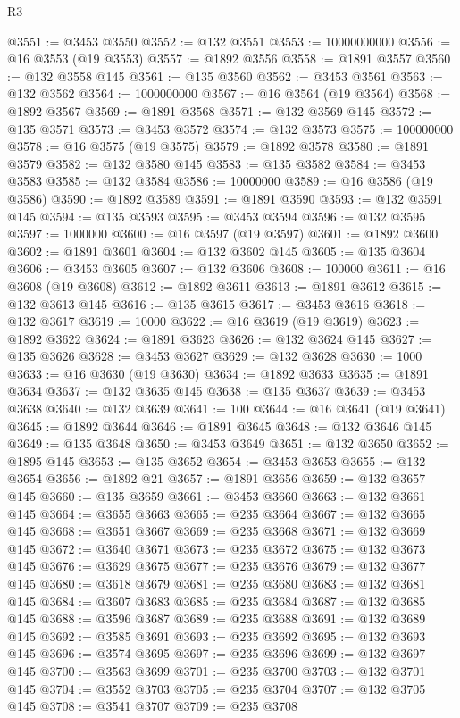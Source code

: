 \begin{lexlean}{R3}
\begin{coremodule}
@3551 := @3453 @3550
@3552 := @132 @3551
@3553 := 10000000000
@3556 := @16 @3553 (@19 @3553)
@3557 := @1892 @3556
@3558 := @1891 @3557
@3560 := @132 @3558 @145
@3561 := @135 @3560
@3562 := @3453 @3561
@3563 := @132 @3562
@3564 := 1000000000
@3567 := @16 @3564 (@19 @3564)
@3568 := @1892 @3567
@3569 := @1891 @3568
@3571 := @132 @3569 @145
@3572 := @135 @3571
@3573 := @3453 @3572
@3574 := @132 @3573
@3575 := 100000000
@3578 := @16 @3575 (@19 @3575)
@3579 := @1892 @3578
@3580 := @1891 @3579
@3582 := @132 @3580 @145
@3583 := @135 @3582
@3584 := @3453 @3583
@3585 := @132 @3584
@3586 := 10000000
@3589 := @16 @3586 (@19 @3586)
@3590 := @1892 @3589
@3591 := @1891 @3590
@3593 := @132 @3591 @145
@3594 := @135 @3593
@3595 := @3453 @3594
@3596 := @132 @3595
@3597 := 1000000
@3600 := @16 @3597 (@19 @3597)
@3601 := @1892 @3600
@3602 := @1891 @3601
@3604 := @132 @3602 @145
@3605 := @135 @3604
@3606 := @3453 @3605
@3607 := @132 @3606
@3608 := 100000
@3611 := @16 @3608 (@19 @3608)
@3612 := @1892 @3611
@3613 := @1891 @3612
@3615 := @132 @3613 @145
@3616 := @135 @3615
@3617 := @3453 @3616
@3618 := @132 @3617
@3619 := 10000
@3622 := @16 @3619 (@19 @3619)
@3623 := @1892 @3622
@3624 := @1891 @3623
@3626 := @132 @3624 @145
@3627 := @135 @3626
@3628 := @3453 @3627
@3629 := @132 @3628
@3630 := 1000
@3633 := @16 @3630 (@19 @3630)
@3634 := @1892 @3633
@3635 := @1891 @3634
@3637 := @132 @3635 @145
@3638 := @135 @3637
@3639 := @3453 @3638
@3640 := @132 @3639
@3641 := 100
@3644 := @16 @3641 (@19 @3641)
@3645 := @1892 @3644
@3646 := @1891 @3645
@3648 := @132 @3646 @145
@3649 := @135 @3648
@3650 := @3453 @3649
@3651 := @132 @3650
@3652 := @1895 @145
@3653 := @135 @3652
@3654 := @3453 @3653
@3655 := @132 @3654
@3656 := @1892 @21
@3657 := @1891 @3656
@3659 := @132 @3657 @145
@3660 := @135 @3659
@3661 := @3453 @3660
@3663 := @132 @3661 @145
@3664 := @3655 @3663
@3665 := @235 @3664
@3667 := @132 @3665 @145
@3668 := @3651 @3667
@3669 := @235 @3668
@3671 := @132 @3669 @145
@3672 := @3640 @3671
@3673 := @235 @3672
@3675 := @132 @3673 @145
@3676 := @3629 @3675
@3677 := @235 @3676
@3679 := @132 @3677 @145
@3680 := @3618 @3679
@3681 := @235 @3680
@3683 := @132 @3681 @145
@3684 := @3607 @3683
@3685 := @235 @3684
@3687 := @132 @3685 @145
@3688 := @3596 @3687
@3689 := @235 @3688
@3691 := @132 @3689 @145
@3692 := @3585 @3691
@3693 := @235 @3692
@3695 := @132 @3693 @145
@3696 := @3574 @3695
@3697 := @235 @3696
@3699 := @132 @3697 @145
@3700 := @3563 @3699
@3701 := @235 @3700
@3703 := @132 @3701 @145
@3704 := @3552 @3703
@3705 := @235 @3704
@3707 := @132 @3705 @145
@3708 := @3541 @3707
@3709 := @235 @3708

\end{coremodule}
\end{lexlean}
